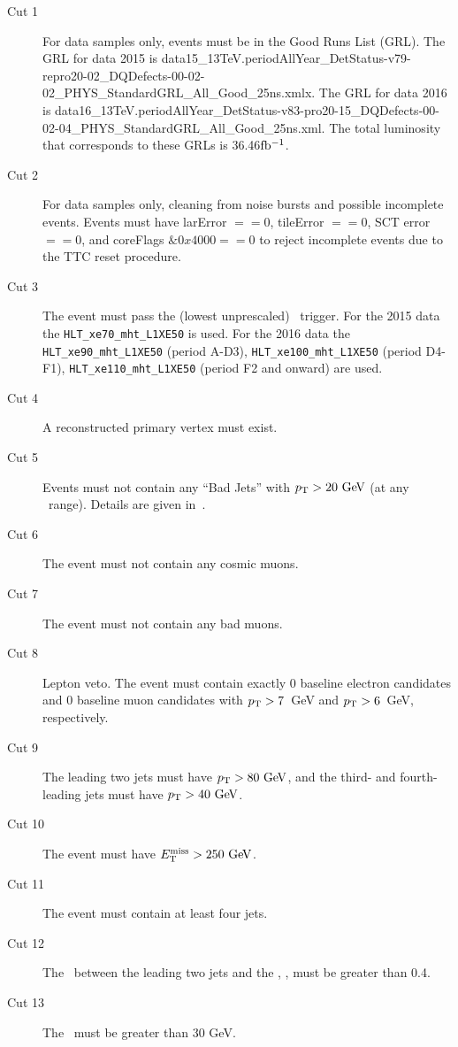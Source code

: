 \begin{description}
\item[Cut 1] For data samples only, events must be in the Good Runs List (GRL). The GRL for data 2015 is {\scriptsize data15\_13TeV.periodAllYear\_DetStatus-v79-repro20-02\_DQDefects-00-02-02\_PHYS\_StandardGRL\_All\_Good\_25ns.xmlx}. The GRL for data 2016 is {\scriptsize data16\_13TeV.periodAllYear\_DetStatus-v83-pro20-15\_DQDefects-00-02-04\_PHYS\_StandardGRL\_All\_Good\_25ns.xml}. 
The total luminosity that corresponds to these GRLs is 36.46$\rm{fb^{-1}}$.
\item[Cut 2] For data samples only, cleaning from noise bursts and possible incomplete events. Events must have larError $== 0$, tileError $== 0$, SCT error $==0$, and coreFlags $\&0x4000 == 0$ to reject incomplete events due to the TTC reset procedure.
\item[Cut 3] The event must pass the (lowest unprescaled) \met\ trigger. For the 2015 data the \verb+HLT_xe70_mht_L1XE50+ is used. For the 2016 data the \verb+HLT_xe90_mht_L1XE50+ (period A-D3), \verb+HLT_xe100_mht_L1XE50+ (period D4-F1), \verb+HLT_xe110_mht_L1XE50+ (period F2 and onward) are used.
\item[Cut 4] A reconstructed primary vertex must exist.
\item[Cut 5] Events must not contain any ``Bad Jets'' with $\pT > 20 \gev$ (at any \eta\ range).  Details are given in~\cite{ATLAS:jetCalib}.
\item[Cut 6] The event must not contain any cosmic muons.
\item[Cut 7] The event must not contain any bad muons.
\item[Cut 8] Lepton veto. The event must contain exactly 0 baseline electron candidates and 0 baseline muon candidates with $p_{\mathrm{T}}>7$~GeV and $p_{\mathrm{T}}>6$~GeV, respectively.
\item[Cut 9] The leading two jets must have $\pt>80\gev$, and the third- and fourth-leading jets must have $\pt>40\gev$.
\item[Cut 10] The event must have $\met > 250 \gev$.  
\item[Cut 11] The event must contain at least four jets.
\item[Cut 12] The \dphi\ between the leading two jets and the \met, \dphijettwomet, must be greater than 0.4.
\item[Cut 13] The \mettrk\ must be greater than 30 GeV.

\end{description}
